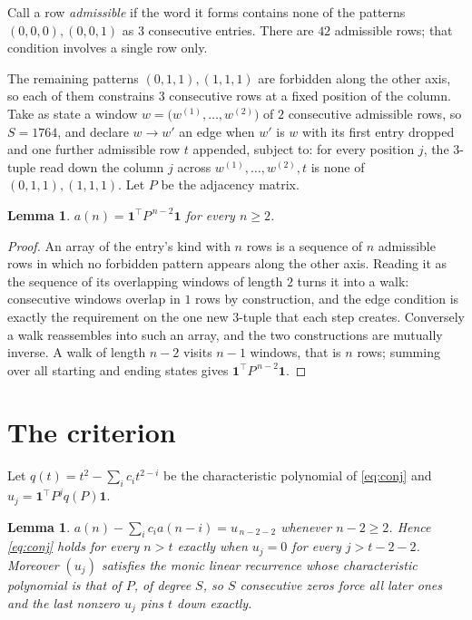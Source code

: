 \documentclass[11pt,a4paper]{article}
\theoremstyle{plain}
\newtheorem{lemma}[theorem]{Lemma}
\theoremstyle{definition}
\begin{document}
Call a row \emph{admissible} if the word it forms contains none of the patterns
$(0,0,0), (0,0,1)$ as $3$ consecutive entries. There are $42$ admissible rows; that condition
involves a single row only.

The remaining patterns $(0,1,1), (1,1,1)$ are forbidden along the other axis, so each of them
constrains $3$ consecutive rows at a fixed position of the column. Take as state a
window $w=\bigl(w^{(1)},\dots,w^{(2)}\bigr)$ of $2$ consecutive admissible
rows, so $S=1764$, and declare $w\to w'$ an edge when $w'$ is $w$ with its first entry
dropped and one further admissible row $t$ appended, subject to: for every position
$j$, the $3$-tuple read down the column $j$ across $w^{(1)},\dots,w^{(2)},t$
is none of $(0,1,1), (1,1,1)$. Let $P$ be the adjacency matrix.

\begin{lemma}\label{lem:walk}
$a(n)=\mathbf{1}^{\!\top}P^{\,n-2}\mathbf{1}$ for every $n\ge2$.
\end{lemma}

\begin{proof}
An array of the entry's kind with $n$ rows is a sequence of $n$ admissible rows in
which no forbidden pattern appears along the other axis. Reading it as the sequence of its
overlapping windows of length $2$ turns it into a walk: consecutive windows overlap in
$1$ rows by construction, and the edge condition is exactly the requirement on the one
new $3$-tuple that each step creates. Conversely a walk reassembles into such an array,
and the two constructions are mutually inverse. A walk of length $n-2$ visits $n-1$
windows, that is $n$ rows; summing over all starting and ending states gives
$\mathbf{1}^{\!\top}P^{\,n-2}\mathbf{1}$.
\end{proof}

\section{The criterion}

Let $q(t)=t^{2}-\sum_i c_i t^{2-i}$ be the characteristic polynomial of
\eqref{eq:conj} and $u_j=\mathbf{1}^{\!\top}P^{j}q(P)\mathbf{1}$.

\begin{lemma}\label{lem:crit}
$a(n)-\sum_i c_i a(n-i)=u_{\,n-2-2}$ whenever $n-2\ge2$. Hence
\eqref{eq:conj} holds for every $n>t$ exactly when $u_j=0$ for every
$j>t-2-2$. Moreover $(u_j)$ satisfies the monic linear recurrence whose
characteristic polynomial is that of $P$, of degree $S$, so $S$ consecutive zeros force all
later ones and the last nonzero $u_j$ pins $t$ down exactly.
\end{lemma}
\end{document}
